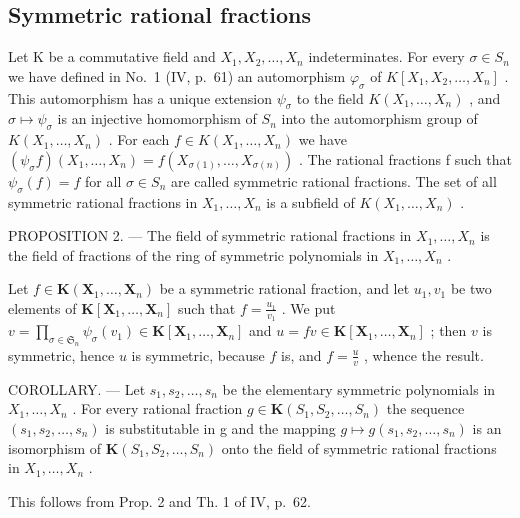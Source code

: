 \subsection{Symmetric rational fractions}

Let K be a commutative field and \(X_{1}, X_{2}, \ldots, X_{n}\) indeterminates. For every \(\sigma \in S_{n}\) we have defined in No.~1 (IV, p.~61) an automorphism \(\varphi_{\sigma}\) of \(K[X_{1}, X_{2}, \ldots, X_{n}]\) . This automorphism has a unique extension \(\psi_{\sigma}\) to the field \(K(X_{1}, \ldots, X_{n})\) , and \(\sigma \mapsto \psi_{\sigma}\) is an injective homomorphism of \(S_{n}\) into the automorphism group of \(K(X_{1}, \ldots, X_{n})\) . For each \(f \in K(X_{1}, \ldots, X_{n})\) we have \((\psi_{\sigma} f) (X_{1}, \ldots, X_{n}) = f(X_{\sigma(1)}, \ldots, X_{\sigma(n)})\) . The rational fractions f such that \(\psi_{\sigma}(f) = f\) for all \(\sigma \in S_{n}\) are called symmetric rational fractions. The set of all symmetric rational fractions in \(X_{1}, \ldots, X_{n}\) is a subfield of \(K(X_{1}, \ldots, X_{n})\) .

PROPOSITION 2. --- The field of symmetric rational fractions in \(X_{1}, \ldots, X_{n}\) is the field of fractions of the ring of symmetric polynomials in \(X_{1}, \ldots, X_{n}\) .

Let \(f \in \mathbf{K}(\mathbf{X}_1, \ldots, \mathbf{X}_n)\) be a symmetric rational fraction, and let \(u_1, v_1\) be two elements of \(\mathbf{K}[\mathbf{X}_1, \ldots, \mathbf{X}_n]\) such that \(f = \frac{u_1}{v_1}\) . We put \(v = \prod_{\sigma \in \mathfrak{S}_n} \psi_\sigma(v_1) \in \mathbf{K}[\mathbf{X}_1, \ldots, \mathbf{X}_n]\) and \(u = fv \in \mathbf{K}[\mathbf{X}_1, \ldots, \mathbf{X}_n]\) ; then \(v\) is symmetric, hence \(u\) is symmetric, because \(f\) is, and \(f = \frac{u}{v}\) , whence the result.

COROLLARY. --- Let \(s_{1}, s_{2}, \ldots, s_{n}\) be the elementary symmetric polynomials in \(X_{1}, \ldots, X_{n}\) . For every rational fraction \(g \in \mathbf{K}(S_{1}, S_{2}, \ldots, S_{n})\) the sequence \((s_{1}, s_{2}, \ldots, s_{n})\) is substitutable in g and the mapping \(g \mapsto g(s_{1}, s_{2}, \ldots, s_{n})\) is an isomorphism of \(\mathbf{K}(S_{1}, S_{2}, \ldots, S_{n})\) onto the field of symmetric rational fractions in \(X_{1}, \ldots, X_{n}\) .

This follows from Prop. 2 and Th. 1 of IV, p.~62.

